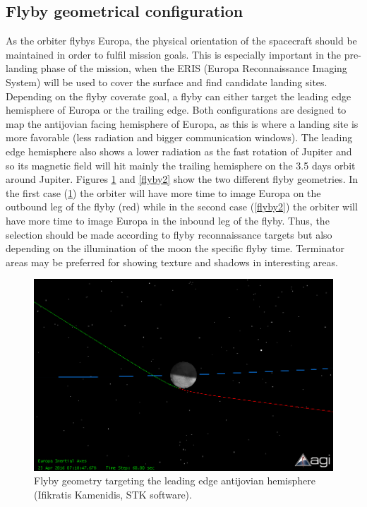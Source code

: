\subsection{Flyby geometrical configuration}
As the orbiter flybys Europa, the physical orientation of the spacecraft should be maintained in order to fulfil mission goals. This is especially important in the pre-landing phase of the mission, when the ERIS (Europa Reconnaissance Imaging System) will be used to cover the surface and find candidate landing sites. 
Depending on the flyby coverate goal, a flyby can either target the leading edge hemisphere of Europa or the trailing edge. Both configurations are designed to map the antijovian facing hemisphere of Europa, as this is where a landing site is more favorable (less radiation and bigger communication windows). The leading edge hemisphere also shows a lower radiation as the fast rotation of Jupiter and so its magnetic field will hit mainly the trailing hemisphere on the 3.5 days orbit around Jupiter. Figures \ref{flyby1} and \ref{flyby2} show the two different flyby geometries. In the first case (\ref{flyby1}) the orbiter will have more time to image Europa on the outbound leg of the flyby (red) while in the second case (\ref{flyby2}) the orbiter will have more time to image Europa in the inbound leg of the flyby. Thus, the selection should be made according to flyby reconnaissance targets but also depending on the illumination of the moon the specific flyby time. Terminator areas may be preferred for showing texture and shadows in interesting areas.

\begin{figure}[htb!]
\centering
\includegraphics[width=\textwidth]{figures/Orbiter/flyby1.png}
\caption{Flyby geometry targeting the leading edge antijovian hemisphere (Ifikratis Kamenidis, STK software).}
\label{flyby1}
\end{figure}

